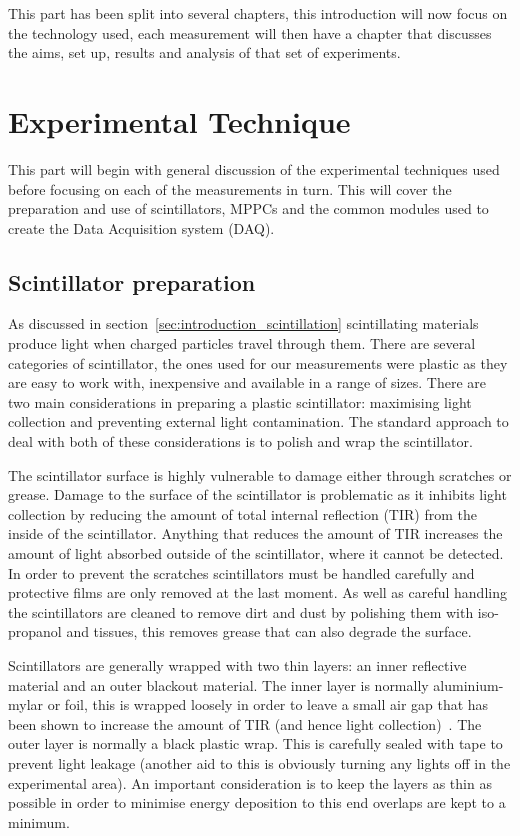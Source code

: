 This part has been split into several chapters, this introduction will now focus on the technology used, each measurement will then have a chapter that discusses the aims, set up, results and analysis of that set of experiments.

\section{Experimental Technique} %
\label{sec:experimental_technique}
This part will begin with general discussion of the experimental techniques used before focusing on each of the measurements in turn. This will cover the preparation and use of scintillators, MPPCs and the common modules used to create the Data Acquisition system (DAQ).
\subsection{Scintillator preparation} %
\label{sub:scintillator_preparation}
As discussed in section~\ref{sec:introduction_scintillation} scintillating materials produce light when charged particles travel through them. There are several categories of scintillator, the ones used for our measurements were plastic as they are easy to work with, inexpensive and available in a range of sizes. There are two main considerations in preparing a plastic scintillator: maximising light collection and preventing external light contamination. The standard approach to deal with both of these considerations is to polish and wrap the scintillator.

The scintillator surface is highly vulnerable to damage either through scratches or grease. Damage to the surface of the scintillator is problematic as it inhibits light collection by reducing the amount of total internal reflection (TIR) from the inside of the scintillator. Anything that reduces the amount of TIR increases the amount of light absorbed outside of the scintillator, where it cannot be detected. In order to prevent the scratches scintillators must be handled carefully and protective films are only removed at the last moment. As well as careful handling the scintillators are cleaned to remove dirt and dust by polishing them with iso-propanol and tissues, this removes grease that can also degrade the surface.

Scintillators are generally wrapped with two thin layers: an inner reflective material and an outer blackout material. The inner layer is normally aluminium-mylar or foil, this is wrapped loosely in order to leave a small air gap that has been shown to increase the amount of TIR (and hence light collection)~\cite{air gap to increase light collection}. The outer layer is normally a black plastic wrap. This is carefully sealed with tape to prevent light leakage (another aid to this is obviously turning any lights off in the experimental area). An important consideration is to keep the layers as thin as possible in order to minimise energy deposition to this end overlaps are kept to a minimum.


